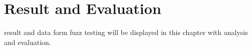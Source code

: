 \chapter{Result and Evaluation}
\renewcommand{\baselinestretch}{\mystretch}
\label{chap:Result}
result and data form fuzz testing will be displayed in this chapter with analysis and evaluation.
